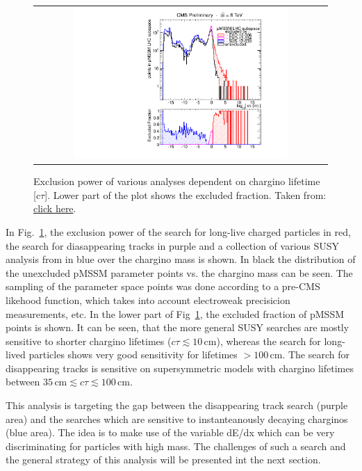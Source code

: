 \begin{figure}[!b]
  \centering 
  \begin{tabular}{c}
    \includegraphics[width=0.75\textwidth]{figures/analysis/pMSSM_vs_ctau.pdf}
  \end{tabular}
  \caption{Exclusion power of various analyses dependent on chargino lifetime [c$\tau$]. Lower part of the plot shows the excluded fraction. Taken from: \href{https://twiki.cern.ch/twiki/bin/view/CMSPublic/PhysicsResultsEXO12034}{click here}.}
  \label{fig:pMSSMplot}
\end{figure}
In Fig.~\ref{fig:pMSSMplot}, the exclusion power of the search for long-live charged particles \cite{bib:CMS:HSCP_8TeV} in red, the search for diasappearing tracks \cite{bib:CMS:DT_8TeV} in purple and a collection of various SUSY analysis from \cite{bib:CMS:pMSSMinterpretation_7TeV_PAS} in blue over the chargino mass is shown. 
In black the distribution of the unexcluded pMSSM parameter points vs. the chargino mass can be seen.
The sampling of the parameter space points was done according to a pre-CMS likehood function, which takes into account electroweak precisicion measurements, etc.
In the lower part of Fig~\ref{fig:pMSSMplot}, the excluded fraction of pMSSM points is shown. 
It can be seen, that the more general SUSY searches are mostly sensitive to shorter chargino lifetimes ($c\tau \lesssim 10 \,\text{cm}$), whereas the search for long-lived particles shows very good sensitivity for lifetimes $>100\,$cm.
The search for disappearing tracks is sensitive on supersymmetric models with chargino lifetimes between $35\,\text{cm} \lesssim c\tau \lesssim 100\,\text{cm}$.

This analysis is targeting the gap between the disappearing track search (purple area) and the searches which are sensitive to instanteanously decaying charginos (blue area). The idea is to make use of the variable dE/dx which can be very discriminating for particles with high mass.
The challenges of such a search and the general strategy of this analysis will be presented int the next section.

